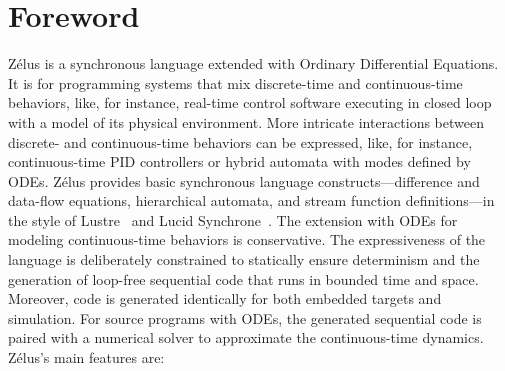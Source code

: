 \documentclass[11pt,titlepage,twoside]{report}
\newcommand{\zelus}{{\sf Z\'elus}}
\newcommand{\lustre}{{\sf Lustre}}
\newcommand{\lucy}{{\sf Lucid Synchrone}}
\begin{document}
\newcommand{\Left}{\mathit{left}}
\newcommand{\Right}{\mathit{right}}

\chapter*{Foreword\label{foreword}} %

\zelus{} is a synchronous language extended with
Ordinary Differential Equations.
It is for programming systems that mix discrete-time and continuous-time
behaviors, like, for instance, real-time control software executing in 
closed loop with a model of its physical environment.
More intricate interactions between discrete- and continuous-time behaviors 
can be expressed, like, for instance, continuous-time PID controllers or 
hybrid automata with modes defined by ODEs.
\zelus{} provides basic synchronous language constructs---difference and 
data-flow equations, hierarchical automata, and stream function 
definitions---in the style of \lustre~\cite{lustre:ieee91} and
\lucy~\cite{lucy:iste07}.
The extension with ODEs for modeling continuous-time behaviors is 
conservative.
The expressiveness of the language is deliberately constrained to statically 
ensure determinism and the generation of loop-free sequential code that runs 
in bounded time and space. Moreover, code is generated identically for both 
embedded targets and simulation. For source programs with ODEs, the 
generated sequential code is paired with a numerical solver to approximate 
the continuous-time dynamics.
%
\zelus's main features are:
\end{document}
